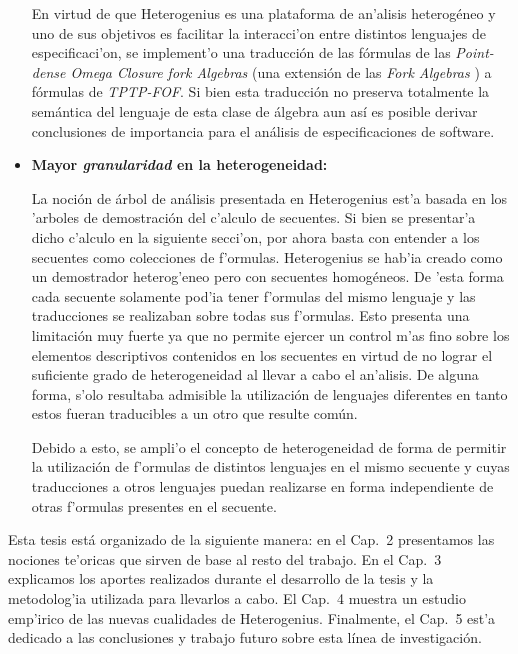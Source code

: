 \begin{itemize}
En virtud de que Heterogenius es una plataforma de an'alisis heterogéneo y uno de sus objetivos es facilitar la interacci'on entre distintos lenguajes de especificaci'on, se implement'o una traducción de las fórmulas de las \emph{Point-dense Omega Closure fork Algebras} \cite{LF06} (una extensión de las \emph{Fork Algebras} \cite{frias02}) a fórmulas de \emph{TPTP-FOF}. Si bien esta traducción no preserva totalmente la semántica del lenguaje de esta clase de álgebra aun así es posible derivar conclusiones de importancia para el análisis de especificaciones de software.


\item \textbf{Mayor \emph{granularidad} en la heterogeneidad:}

La noción de árbol de análisis presentada en Heterogenius est'a basada en los 'arboles de demostración del c'alculo de secuentes.
Si bien se presentar'a dicho c'alculo en la siguiente secci'on, por ahora basta con entender a los secuentes como colecciones de f'ormulas.
Heterogenius se hab'ia creado como un demostrador heterog'eneo pero con secuentes homogéneos. 
De 'esta forma cada secuente solamente pod'ia tener f'ormulas del mismo lenguaje y las traducciones se realizaban sobre todas sus f'ormulas. 
Esto presenta una limitación muy fuerte ya que no permite ejercer un control m'as fino sobre los elementos descriptivos contenidos en los secuentes en virtud de no lograr el suficiente grado de heterogeneidad al llevar a cabo el an'alisis.
De alguna forma, s'olo resultaba admisible la utilización de lenguajes diferentes en tanto estos fueran traducibles a un otro que resulte común.

Debido a esto, se ampli'o el concepto de heterogeneidad de forma de permitir la utilización de f'ormulas de distintos lenguajes en el mismo secuente y cuyas traducciones a otros lenguajes puedan realizarse en forma independiente de otras f'ormulas presentes en el secuente.
\end{itemize}

Esta tesis está organizado de la siguiente manera: en el Cap.~2 presentamos las nociones te'oricas que sirven de base al resto del trabajo.
En el Cap.~3 explicamos los aportes realizados durante el desarrollo de la tesis y la metodolog'ia utilizada para llevarlos a cabo. El Cap.~4 muestra un estudio emp'irico de las nuevas cualidades de Heterogenius. Finalmente, el Cap.~5 est'a dedicado a las conclusiones y trabajo futuro sobre esta línea de investigación.
